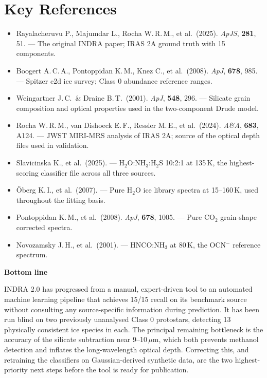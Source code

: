 \documentclass[11pt,a4paper]{article}
\newcommand{\um}{\,$\mu$m}
\newcommand{\htwoo}{H$_2$O}
\newcommand{\cotwo}{CO$_2$}
\newcommand{\ocn}{OCN$^-$}
\begin{document}
\section*{Key References}

\small
\begin{itemize}[leftmargin=1.2em]
  \item Rayalacheruvu P., Majumdar L., Rocha W.\,R.\,M., et al.\ (2025).
        \textit{ApJS}, \textbf{281}, 51. --- The original INDRA paper;
        IRAS 2A ground truth with 15 components.
  \item Boogert A.\,C.\,A., Pontoppidan K.\,M., Knez C., et al.\ (2008).
        \textit{ApJ}, \textbf{678}, 985. --- Spitzer c2d ice survey;
        Class 0 abundance reference ranges.
  \item Weingartner J.\,C.\ \& Draine B.\,T.\ (2001). \textit{ApJ},
        \textbf{548}, 296. --- Silicate grain composition and optical
        properties used in the two-component Drude model.
  \item Rocha W.\,R.\,M., van Dishoeck E.\,F., Ressler M.\,E., et al.\
        (2024). \textit{A\&A}, \textbf{683}, A124. --- JWST MIRI-MRS
        analysis of IRAS 2A; source of the optical depth files used in
        validation.
  \item Slavicinska K., et al.\ (2025). --- \htwoo:NH$_3$:H$_2$S 10:2:1 at
        135\,K, the highest-scoring classifier file across all three
        sources.
  \item Öberg K.\,I., et al.\ (2007). --- Pure \htwoo{} ice library spectra
        at 15--160\,K, used throughout the fitting basis.
  \item Pontoppidan K.\,M., et al.\ (2008). \textit{ApJ}, \textbf{678},
        1005. --- Pure \cotwo{} grain-shape corrected spectra.
  \item Novozamsky J.\,H., et al.\ (2001). --- HNCO:NH$_3$ at 80\,K, the
        \ocn{} reference spectrum.
\end{itemize}
\normalsize

\vspace{1.2cm}
\begin{tcolorbox}[colback=navy, colframe=navy, arc=2pt,
                  left=12pt, right=12pt, top=10pt, bottom=10pt]
{\color{white}\large\bfseries Bottom line\par}
\vspace{4pt}
{\color{white}
INDRA 2.0 has progressed from a manual, expert-driven tool to an automated
machine learning pipeline that achieves 15/15 recall on its benchmark
source without consulting any source-specific information during
prediction. It has been run blind on two previously unanalysed Class 0
protostars, detecting 13 physically consistent ice species in each. The
principal remaining bottleneck is the accuracy of the silicate subtraction
near 9--10\um, which both prevents methanol detection and inflates the
long-wavelength optical depth. Correcting this, and retraining the
classifiers on Gaussian-derived synthetic data, are the two highest-priority
next steps before the tool is ready for publication.}
\end{tcolorbox}
\end{document}

